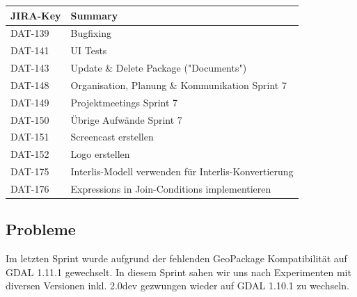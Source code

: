 \begin{table}[H]	
\centering
\begin{tabular}{ll}
\toprule
\textbf{JIRA-Key} & \textbf{Summary}\\
\midrule
DAT-139 & Bugfixing \\
DAT-141 & UI Tests \\
DAT-143 & Update \& Delete Package ("Documents") \\
DAT-148 & Organisation, Planung \& Kommunikation Sprint 7 \\
DAT-149 & Projektmeetings Sprint 7 \\
DAT-150 & Übrige Aufwände Sprint 7 \\
DAT-151 & Screencast erstellen \\
DAT-152 & Logo erstellen \\
DAT-175 & Interlis-Modell verwenden für Interlis-Konvertierung \\
DAT-176 & Expressions in Join-Conditions implementieren \\
\bottomrule
\end{tabular}	
\end{table}

\subsection*{Probleme}
Im letzten Sprint wurde aufgrund der fehlenden GeoPackage Kompatibilität auf GDAL 1.11.1 gewechselt. In diesem Sprint sahen wir uns nach Experimenten mit diversen Versionen inkl. 2.0dev gezwungen wieder auf GDAL 1.10.1 zu wechseln.